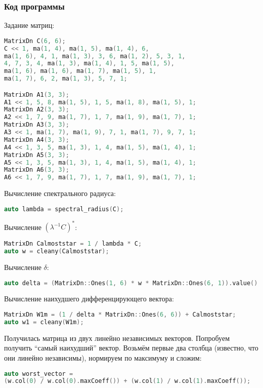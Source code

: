 \documentclass[specialist,
	substylefile = spbu_report.rtx,
	subf,href,colorlinks=true, 12pt]{disser}
\begin{document}
\subsubsection{Код программы}

Задание матриц:
\begin{lstlisting}[language=c++,basicstyle=\small\ttfamily,keywordstyle=\color{red}]
MatrixDn C(6, 6);
C << 1, ma(1, 4), ma(1, 5), ma(1, 4), 6,
ma(1, 6), 4, 1, ma(1, 3), 3, 6, ma(1, 2), 5, 3, 1,
4, 7, 3, 4, ma(1, 3), ma(1, 4), 1, 5, ma(1, 5),
ma(1, 6), ma(1, 6), ma(1, 7), ma(1, 5), 1,
ma(1, 7), 6, 2, ma(1, 3), 5, 7, 1;

MatrixDn A1(3, 3);
A1 << 1, 5, 8, ma(1, 5), 1, 5, ma(1, 8), ma(1, 5), 1;
MatrixDn A2(3, 3);
A2 << 1, 7, 9, ma(1, 7), 1, 7, ma(1, 9), ma(1, 7), 1;
MatrixDn A3(3, 3);
A3 << 1, ma(1, 7), ma(1, 9), 7, 1, ma(1, 7), 9, 7, 1;
MatrixDn A4(3, 3);
A4 << 1, 3, 5, ma(1, 3), 1, 4, ma(1, 5), ma(1, 4), 1;
MatrixDn A5(3, 3);
A5 << 1, 3, 5, ma(1, 3), 1, 4, ma(1, 5), ma(1, 4), 1;
MatrixDn A6(3, 3);
A6 << 1, 7, 9, ma(1, 7), 1, 7, ma(1, 9), ma(1, 7), 1;
\end{lstlisting}

Вычисление спектрального радиуса:
\begin{lstlisting}[language=c++,basicstyle=\footnotesize\ttfamily]
auto lambda = spectral_radius(C);
\end{lstlisting}

Вычисление $(\lambda^{-1}C)^*$:
\begin{lstlisting}[language=c++,basicstyle=\footnotesize\ttfamily]
MatrixDn Calmoststar = 1 / lambda * C;
auto w = cleany(Calmoststar);
\end{lstlisting}


Вычисление $\delta$:
\begin{lstlisting}[language=c++,basicstyle=\footnotesize\ttfamily]
auto delta = (MatrixDn::Ones(1, 6) * w * MatrixDn::Ones(6, 1)).value();
\end{lstlisting}

Вычисление наихудшего дифференцирующего вектора:
\begin{lstlisting}[language=c++,basicstyle=\footnotesize\ttfamily]
MatrixDn W1m = (1 / delta * MatrixDn::Ones(6, 6)) + Calmoststar;
auto w1 = cleany(W1m);
\end{lstlisting}

Получилась матрица из двух линейно независимых векторов. Попробуем получить \enquote{самый наихудший} вектор. Возьмём первые два столбца (известно, что они линейно независимы), нормируем по максимуму и сложим:
\begin{lstlisting}[language=c++,basicstyle=\footnotesize\ttfamily]
auto worst_vector =
(w.col(0) / w.col(0).maxCoeff()) + (w.col(1) / w.col(1).maxCoeff());
\end{lstlisting}
\end{document}
